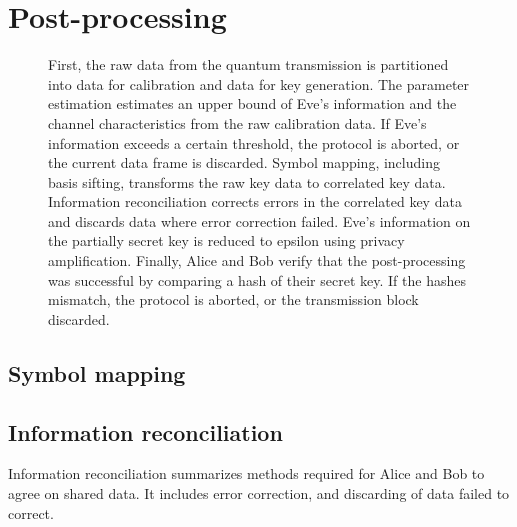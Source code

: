 \section{Post-processing}

\begin{figure}[htb]
	\centering
	
	\caption{First, the raw data from the quantum transmission is partitioned into data for calibration and data for key generation. The parameter estimation estimates an upper bound of Eve's information and the channel characteristics from the raw calibration data. If Eve's information exceeds a certain threshold, the protocol is aborted, or the current data frame is discarded. Symbol mapping, including basis sifting, transforms the raw key data to correlated key data. Information reconciliation corrects errors in the correlated key data and discards data where error correction failed. Eve's information on the partially secret key is reduced to epsilon using privacy amplification. Finally, Alice and Bob verify that the post-processing was successful by comparing a hash of their secret key. If the hashes mismatch, the protocol is aborted, or the transmission block discarded.}\label{fig:post_processing}
\end{figure}

\cite{Silberhorn2002} %

\FloatBarrier
\subsection{Symbol mapping}

\cite{Leverrier2008} %
\cite{Elkouss2011} %

\FloatBarrier
\subsection{Information reconciliation}

Information reconciliation summarizes methods required for Alice and Bob to agree on shared data.
It includes error correction, and discarding of data failed to correct.

